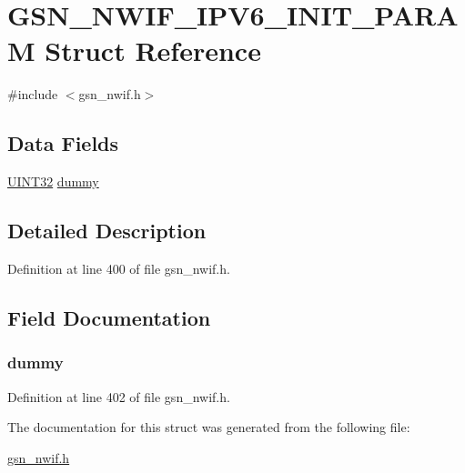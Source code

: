 \hypertarget{a00174}{
\section{GSN\_\-NWIF\_\-IPV6\_\-INIT\_\-PARAM Struct Reference}
\label{a00174}
}


{\ttfamily \#include $<$gsn\_\-nwif.h$>$}

\subsection*{Data Fields}
\begin{DoxyCompactItemize}
\item 
\hyperlink{a00660_gae1e6edbbc26d6fbc71a90190d0266018}{UINT32} \hyperlink{a00174_a60eb8a6fd120dd10ad8f59f6f3b74b39}{dummy}
\end{DoxyCompactItemize}


\subsection{Detailed Description}


Definition at line 400 of file gsn\_\-nwif.h.



\subsection{Field Documentation}
\hypertarget{a00174_a60eb8a6fd120dd10ad8f59f6f3b74b39}{
\subsubsection[{dummy}]{ {\bf dummy}}}
\label{a00174_a60eb8a6fd120dd10ad8f59f6f3b74b39}


Definition at line 402 of file gsn\_\-nwif.h.



The documentation for this struct was generated from the following file:\begin{DoxyCompactItemize}
\item 
\hyperlink{a00534}{gsn\_\-nwif.h}\end{DoxyCompactItemize}
